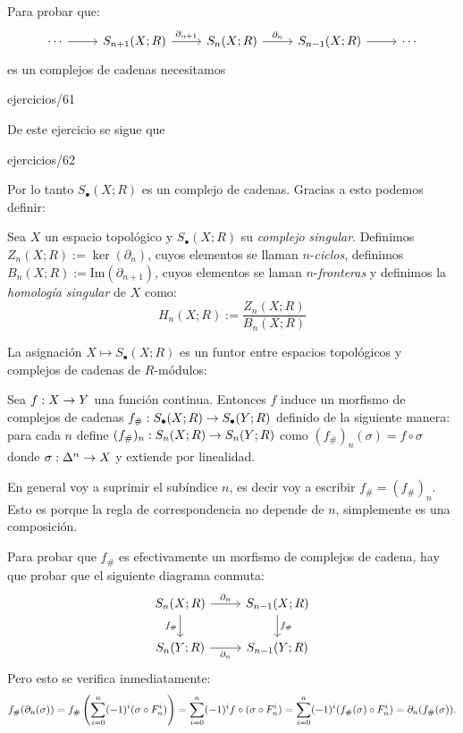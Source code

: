 \documentclass[../../topologia_algebraica]{subfiles}
\begin{document}
Para probar que:
\[
  \begin{tikzcd}
    \cdots \arrow[r] & S_{n+1}(X;R) \arrow[r,"\partial_{n+1}"] & S_n(X;R) \arrow[r,"\partial_n"]
    & S_{n-1}(X;R) \arrow[r] & \cdots
  \end{tikzcd}
\]
es un complejos de cadenas necesitamos

{ejercicios/61} %

De este ejercicio se sigue que

{ejercicios/62} %

Por lo tanto $S_{\bullet}(X;R)$ es un complejo de cadenas. Gracias a esto podemos definir:

\begin{defin}
  Sea $X$ un espacio topol\'ogico y $S_{\bullet}(X;R)$ su \emph{complejo singular}. Definimos
  $Z_n(X;R):= \ker(\partial_n)$, cuyos elementos se llaman $n$-\emph{ciclos}, definimos
  $B_n(X;R):=\text{Im}(\partial_{n+1})$, cuyos elementos se laman
  $n$-\emph{fronteras} y definimos la \emph{homolog\'ia singular} de $X$ como:
  \[
    H_n(X;R):=\frac{Z_n(X;R)}{B_n(X;R)}
  \]
\end{defin}

La asignaci\'on $X\mapsto S_{\bullet}(X;R)$ es un funtor entre espacios topol\'ogicos y
complejos de cadenas de $R$-m\'odulos:

\begin{defin}
  Sea $f:X\rightarrow Y$ una funci\'on continua. Entonces $f$ induce un morfismo de complejos de cadenas
  $f_{\#}:S_{\bullet}(X;R)\rightarrow S_{\bullet}(Y;R)$ definido de la siguiente manera: para cada $n$ define
  $(f_{\#})_n:S_n(X;R)\rightarrow S_n(Y;R)$ como $(f_{\#})_n(\sigma)=f\circ\sigma$ donde $\sigma:\Delta^n\rightarrow X$
  y extiende por linealidad.
\end{defin}

\begin{nota}
  En general voy a suprimir el sub\'indice $n$, es decir voy a escribir $f_{\#}=(f_{\#})_n$. Esto es porque
  la regla de correspondencia no depende de $n$, simplemente es una composici\'on.
\end{nota}

Para probar que $f_{\#}$ es efectivamente un morfismo de complejos de cadena, hay que probar que el
siguiente diagrama conmuta:
\[
  \begin{tikzcd}
    S_n(X;R) \arrow[r,"\partial_n"] \arrow[d,"f_{\#}"'] & S_{n-1}(X;R) \arrow[d,"f_{\#}"] \\
    S_n(Y;R) \arrow[r,"\partial_n"'] & S_{n-1}(Y;R) 
  \end{tikzcd}
\]
Pero esto se verifica inmediatamente:
\[
  f_{\#}(\partial_n(\sigma))=
  f_{\#}\left( \sum_{i=0}^n (-1)^i (\sigma\circ F^i_n) \right)=
  \sum_{i=0}^n (-1)^i f\circ(\sigma\circ F^i_n)=
  \sum_{i=0}^n (-1)^i (f_{\#}(\sigma)\circ F^i_n)=
  \partial_n (f_{\#}(\sigma)).
\]
\end{document}
